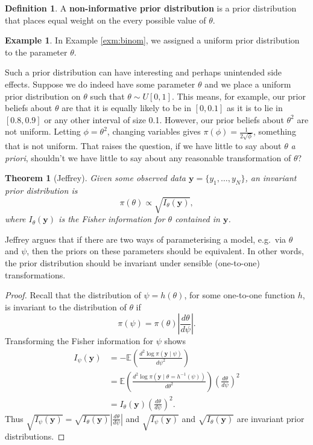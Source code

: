 \documentclass[
]{book}
\newtheorem{theorem}{Theorem}[chapter]
\theoremstyle{definition}
\newtheorem{definition}{Definition}[chapter]
\theoremstyle{definition}
\newtheorem{example}{Example}[chapter]
\theoremstyle{definition}
\theoremstyle{definition}
\theoremstyle{remark}
\begin{document}
\begin{definition}
A \textbf{non-informative prior distribution} is a prior distribution that places equal weight on the every possible value of \(\theta\).
\end{definition}

\begin{example}
In Example \ref{exm:binom}, we assigned a uniform prior distribution to the parameter \(\theta\).
\end{example}

Such a prior distribution can have interesting and perhaps unintended side effects. Suppose we do indeed have some parameter \(\theta\) and we place a uniform prior distribution on \(\theta\) such that \(\theta \sim U[0, 1]\). This means, for example, our prior beliefs about \(\theta\) are that it is equally likely to be in \([0, 0.1]\) as it is to lie in \([0.8, 0.9]\) or any other interval of size 0.1. However, our prior beliefs about \(\theta^2\) are not uniform. Letting \(\phi = \theta^2\), changing variables gives \(\pi(\phi) = \frac{1}{2\sqrt{\phi}}\), something that is not uniform. That raises the question, if we have little to say about \(\theta\) \textit{a priori}, shouldn't we have little to say about any reasonable transformation of \(\theta\)?

\begin{theorem}[Jeffrey]
Given some observed data \(\boldsymbol{y} = \{y_1, \ldots, y_N\}\), an invariant prior distribution is
\[
\pi(\theta) \propto \sqrt{I_\theta(\boldsymbol{y})},
\]
where \(I_\theta(\boldsymbol{y})\) is the Fisher information for \(\theta\) contained in \(\boldsymbol{y}\).
\end{theorem}

Jeffrey argues that if there are two ways of parameterising a model, e.g.~via \(\theta\) and \(\psi\), then the priors on these parameters should be equivalent. In other words, the prior distribution should be invariant under sensible (one-to-one) transformations.

\begin{proof}
Recall that the distribution of \(\psi = h(\theta)\), for some one-to-one function \(h\), is invariant to the distribution of \(\theta\) if
\[
\pi(\psi) = \pi(\theta) \left|\frac{d\theta}{d\psi}\right|.
\]
Transforming the Fisher information for \(\psi\) shows
\begin{align*}
I_\psi(\boldsymbol{y}) &= - \mathbb{E}\left(\frac{d^2\log \pi(\boldsymbol{y} \mid \psi)}{d\psi^2}\right) \\
& = \mathbb{E}\left(\frac{d^2 \log \pi(\boldsymbol{y} \mid \theta = h^{-1}(\psi))}{d\theta^2}\right) \left(\frac{d\theta}{d\psi}\right)^2 \\
& = I_\theta(\boldsymbol{y})\left(\frac{d\theta}{d\psi}\right)^2 .
\end{align*}
Thus \(\sqrt{I_\psi(\boldsymbol{y})} = \sqrt{I_\theta(\boldsymbol{y})} \left|\frac{d\theta}{d\psi}\right|\) and \(\sqrt{I_\psi(\boldsymbol{y})}\) and \(\sqrt{I_\theta(\boldsymbol{y})}\) are invariant prior distributions.
\end{proof}
\end{document}
